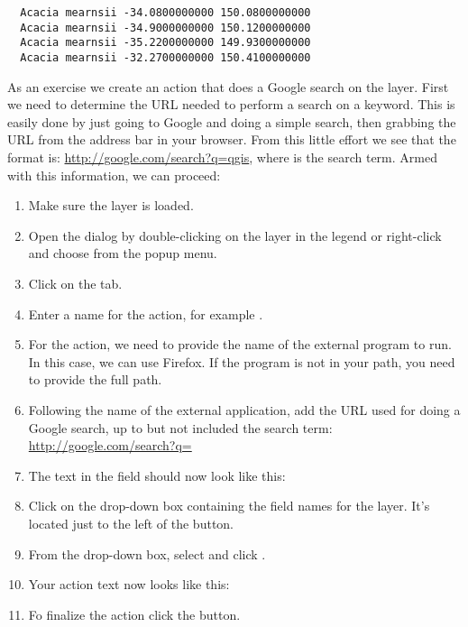 \begin{verbatim}
  Acacia mearnsii -34.0800000000 150.0800000000
  Acacia mearnsii -34.9000000000 150.1200000000
  Acacia mearnsii -35.2200000000 149.9300000000
  Acacia mearnsii -32.2700000000 150.4100000000
\end{verbatim}

As an exercise we create an action that does a Google search on the
 layer. First we need to determine the URL needed to perform a search on a
keyword. This is easily done by just going to Google and doing a simple
search, then grabbing the URL from the address bar in your browser. From this
little effort we see that the format is: \url{http://google.com/search?q=qgis},
where \usertext{\qg} is the search term. Armed with this information, we can
proceed:

\begin{enumerate}
\item Make sure the  layer is loaded.
\item Open the  dialog by double-clicking on the layer in the
  legend or right-click and choose  from the popup menu.
\item Click on the  tab.
\item Enter a name for the action, for example .
\item For the action, we need to provide the name of the external program to
  run. In this case, we can use Firefox. If the program is not in
  your path, you need to provide the full path.
\item Following the name of the external application, add the URL used for
  doing a Google search, up to but not included the search term:
  \url{http://google.com/search?q=}
\item The text in the  field should now look like this:\\
\item Click on the drop-down box containing the field names for the
   layer. It's located just to the left of the
   button.
\item From the drop-down box, select  and click .
\item Your action text now looks like this:\\ 
\item Fo finalize the action click the  button.
\end{enumerate}

